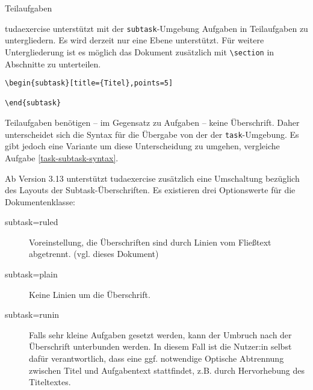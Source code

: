 \documentclass[
	german,%
	accentcolor=9c,%
	points=true, für die Aktivierung der Punktereferenzen
]{tudaexercise}
\newcommand*{\code}[1]{\texttt{#1}}
\newcommand*{\cls}[1]{\textsf{#1}}
\let\tbs\textbackslash
\begin{document}
\begin{task}{Teilaufgaben}
	\begin{subtask}[title={Grundsturktur}]
		\cls{tudaexercise} unterstützt mit der \code{subtask}-Umgebung Aufgaben in Teilaufgaben zu untergliedern. Es wird derzeit nur eine Ebene unterstützt. Für weitere Untergliederung ist es möglich das Dokument zusätzlich mit \code{\tbs{}section} in Abschnitte zu unterteilen.

\begin{verbatim}
\begin{subtask}[title={Titel},points=5]

\end{subtask}
\end{verbatim}

		Teilaufgaben benötigen – im Gegensatz zu Aufgaben – keine Überschrift. Daher unterscheidet sich die Syntax für die Übergabe von der der \code{task}-Umgebung. Es gibt jedoch eine Variante um diese Unterscheidung zu umgehen, vergleiche Aufgabe \ref{task-subtask-syntax}.
	\end{subtask}

	\begin{subtask}[title={Anpassung der Überschriften}]
		Ab Version 3.13 unterstützt \cls{tudaexercise} zusätzlich eine Umschaltung bezüglich des Layouts der Subtask-Überschriften. Es existieren drei Optionswerte für die Dokumentenklasse:
		\begin{description}
			\item[subtask=ruled] Voreinstellung, die Überschriften sind durch Linien vom Fließtext abgetrennt. (vgl. dieses Dokument)
			\item[subtask=plain] Keine Linien um die Überschrift.
			\item[subtask=runin] Falls sehr kleine Aufgaben gesetzt werden, kann der Umbruch nach der Überschrift unterbunden werden. In diesem Fall ist die Nutzer:in selbst dafür verantwortlich, dass eine ggf. notwendige Optische Abtrennung zwischen Titel und Aufgabentext stattfindet, z.B. durch Hervorhebung des Titeltextes.
		\end{description}
	\end{subtask}
\end{task}
\end{document}
